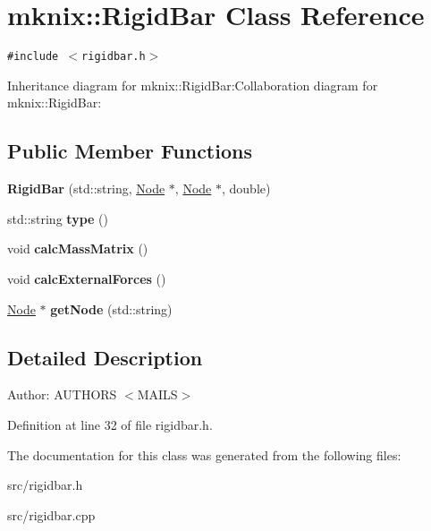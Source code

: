 \hypertarget{classmknix_1_1RigidBar}{
\section{mknix::RigidBar Class Reference}
\label{classmknix_1_1RigidBar}
}
{\tt \#include $<$rigidbar.h$>$}

Inheritance diagram for mknix::RigidBar:Collaboration diagram for mknix::RigidBar:\subsection*{Public Member Functions}
\begin{CompactItemize}
\item 
\hypertarget{classmknix_1_1RigidBar_c47bc0c8fc15e799f67a76925b5919bf}{
\textbf{RigidBar} (std::string, \hyperlink{classmknix_1_1Node}{Node} $\ast$, \hyperlink{classmknix_1_1Node}{Node} $\ast$, double)}
\label{classmknix_1_1RigidBar_c47bc0c8fc15e799f67a76925b5919bf}

\item 
\hypertarget{classmknix_1_1RigidBar_d37cfb3f32f673bcd2eb22ead9372632}{
std::string \textbf{type} ()}
\label{classmknix_1_1RigidBar_d37cfb3f32f673bcd2eb22ead9372632}

\item 
\hypertarget{classmknix_1_1RigidBar_3d368a1a10b600179fbb7e901472c301}{
void \textbf{calcMassMatrix} ()}
\label{classmknix_1_1RigidBar_3d368a1a10b600179fbb7e901472c301}

\item 
\hypertarget{classmknix_1_1RigidBar_4325fbe1df7832ce09bd2bf72b00cf67}{
void \textbf{calcExternalForces} ()}
\label{classmknix_1_1RigidBar_4325fbe1df7832ce09bd2bf72b00cf67}

\item 
\hypertarget{classmknix_1_1RigidBar_3b644ec91ee5acc3efb7fdeb6b495e8a}{
\hyperlink{classmknix_1_1Node}{Node} $\ast$ \textbf{getNode} (std::string)}
\label{classmknix_1_1RigidBar_3b644ec91ee5acc3efb7fdeb6b495e8a}

\end{CompactItemize}


\subsection{Detailed Description}
\begin{Desc}
\item[Author:]AUTHORS $<$MAILS$>$ \end{Desc}


Definition at line 32 of file rigidbar.h.

The documentation for this class was generated from the following files:\begin{CompactItemize}
\item 
src/rigidbar.h\item 
src/rigidbar.cpp\end{CompactItemize}
